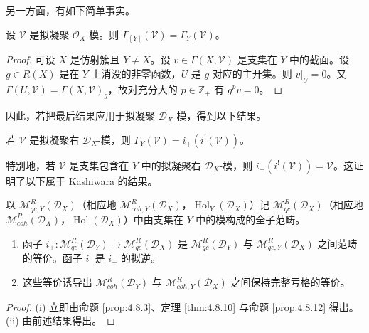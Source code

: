 另一方面，有如下简单事实。

\begin{lemma}\label{lem:4.8.11}
设 $\mathcal{V}$ 是拟凝聚 $\mathcal{O}_X$-模。则 $\Gamma_{[Y]}(\mathcal{V})=\Gamma_Y(\mathcal{V})$。
\end{lemma}

\begin{proof}
可设 $X$ 是仿射簇且 $Y\ne X$。设 $v\in\Gamma(X,\mathcal{V})$ 是支集在 $Y$ 中的截面。设 $g\in R(X)$ 是在 $Y$ 上消没的非零函数，$U$ 是 $g$ 对应的主开集。则 $v|_U=0$。又 $\Gamma(U,\mathcal{V})=\Gamma(X,\mathcal{V})_g$，故对充分大的 $p\in\mathbb{Z}_+$ 有 $g^pv=0$。
\end{proof}

因此，若把最后结果应用于拟凝聚 $\mathcal{D}_X$-模，得到以下结果。

\begin{proposition}\label{prop:4.8.12}
若 $\mathcal{V}$ 是拟凝聚右 $\mathcal{D}_X$-模，则 $\Gamma_Y(\mathcal{V})=i_+(i^!(\mathcal{V}))$。
\end{proposition}

特别地，若 $\mathcal{V}$ 是支集包含在 $Y$ 中的拟凝聚右 $\mathcal{D}_X$-模，则 $i_+(i^!(\mathcal{V}))=\mathcal{V}$。这证明了以下属于 Kashiwara 的结果。

以 $\mathcal{M}^R_{qc,Y}(\mathcal{D}_X)$（相应地 $\mathcal{M}^R_{coh,Y}(\mathcal{D}_X)$，$\operatorname{Hol}_Y(\mathcal{D}_X)$）记
$\mathcal{M}^R_{qc}(\mathcal{D}_X)$（相应地 $\mathcal{M}^R_{coh}(\mathcal{D}_X)$，$\operatorname{Hol}(\mathcal{D}_X)$）中由支集在 $Y$ 中的模构成的全子范畴。

\begin{theorem}[Kashiwara 定理]\label{thm:4.8.13}
\begin{enumerate}[label=(\roman*)]
  \item 函子 $i_+:\mathcal{M}^R_{qc}(\mathcal{D}_Y)\to\mathcal{M}^R_{qc}(\mathcal{D}_X)$ 是
    $\mathcal{M}^R_{qc}(\mathcal{D}_Y)$ 与 $\mathcal{M}^R_{qc,Y}(\mathcal{D}_X)$ 之间范畴的等价。函子 $i^!$ 是 $i_+$ 的拟逆。
  \item 这些等价诱导出 $\mathcal{M}^R_{coh}(\mathcal{D}_Y)$ 与 $\mathcal{M}^R_{coh,Y}(\mathcal{D}_X)$ 之间保持完整亏格的等价。
\end{enumerate}
\end{theorem}

\begin{proof}
(i) 立即由命题 \ref{prop:4.8.3}、定理 \ref{thm:4.8.10} 与命题 \ref{prop:4.8.12} 得出。
(ii) 由前述结果得出。
\end{proof}

